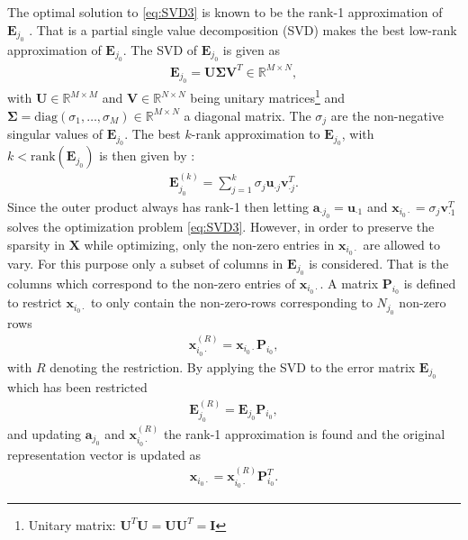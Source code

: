 The optimal solution to \eqref{eq:SVD3} is known to be the rank-1 approximation of $\mathbf{E}_{j_{0}}$ \cite[p. 232]{Elad_book}. That is a partial single value decomposition (SVD) makes the best low-rank approximation of $\mathbf{E}_{j_0}$. 
The SVD of $\mathbf{E}_{j_0}$ is given as
\begin{align*}
\mathbf{E}_{j_0} = \mathbf{U} \boldsymbol{\Sigma} \mathbf{V}^T \in \mathbb{R}^{M \times N},
\end{align*}
with $\mathbf{U} \in \mathbb{R}^{M \times M}$ and $\mathbf{V} \in \mathbb{R}^{N \times N}$ being unitary matrices\footnote{Unitary matrix: $\mathbf{U}^T \mathbf{U} = \mathbf{UU}^T = \mathbf{I}$} and $\boldsymbol{\Sigma} = \text{diag}\left(\sigma_1, \dots, \sigma_M \right) \in \mathbb{R}^{M \times N}$ a diagonal matrix. 
The $\sigma_j$ are the non-negative singular values of $\mathbf{E}_{j_0}$. 
The best $k$-rank approximation to $\mathbf{E}_{j_0}$, with $k < \text{rank}(\mathbf{E}_{j_0})$ is then given by \cite[p. 232]{Elad_book}: 
\begin{align*}
\mathbf{E}_{j_{0}}^{(k)} = \sum_{j=1}^{k} \sigma_j \mathbf{u}_{\cdot j} \mathbf{v}_{\cdot j}^T.
\end{align*} 
Since the outer product always has rank-1 then letting $\mathbf{a}_{\cdot j_0} = \mathbf{u}_{\cdot 1}$ and $\mathbf{x}_{i_0 \cdot} = \sigma_{j} \mathbf{v}_{\cdot 1}^T$ solves the optimization problem \eqref{eq:SVD3}.
However, in order to preserve the sparsity in $\mathbf{X}$ while optimizing, only the non-zero entries in $\mathbf{x}_{i_0 \cdot}$ are allowed to vary. 
For this purpose only a subset of columns in $\mathbf{E}_{j_0}$ is considered.
That is the columns which correspond to the non-zero entries of $\mathbf{x}_{i_0 \cdot}$. 
A matrix $\mathbf{P}_{i_0}$ is defined to restrict $\mathbf{x}_{i_0 \cdot}$ to only contain the non-zero-rows corresponding to $N_{j_0}$ non-zero rows
\begin{align*}
\mathbf{x}_{i_0 \cdot}^{(R)} = \mathbf{x}_{i_0 \cdot} \mathbf{P}_{i_0},
\end{align*}
with $R$ denoting the restriction. 
By applying the SVD to the error matrix $\mathbf{E}_{j_0}$ which has been restricted
\begin{align*}
\mathbf{E}_{j_0}^{(R)} = \mathbf{E}_{j_0} \mathbf{P}_{i_0},
\end{align*}
and updating $\mathbf{a}_{j_0}$ and $\mathbf{x}_{i_0 \cdot}^{(R)}$ the rank-1 approximation is found and the original representation vector is updated as 
\begin{align*}
\mathbf{x}_{i_0 \cdot} = \mathbf{x}_{i_0 \cdot}^{(R)} \mathbf{P}_{i_0}^{T}.
\end{align*}
